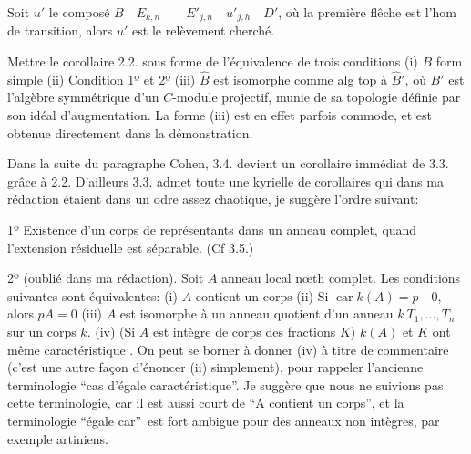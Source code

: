 Soit $u'$ le composé  $B\quad E_{k,n}\qquad E'_{j,n}\quad u'_{j,h}\quad D'$, où la première flêche est l'hom de transition, alors $u'$ est le relèvement cherché.

Mettre le corollaire 2.2. sous forme de l'équivalence de trois conditions (i) $B$ form simple (ii) Condition 1º et 2º (iii) $\hat B$ est isomorphe comme alg top à $\hat B'$, où $B'$ est l'algèbre symmétrique d'un $C$-module projectif, munie de  sa topologie définie par son idéal d'augmentation. La forme (iii) est en effet parfois commode, et est obtenue directement dans la démonstration.


Dans la suite du paragraphe Cohen, 3.4. devient un corollaire immédiat de 3.3. grâce à 2.2. D'ailleurs 3.3. admet toute une kyrielle de corollaires qui dans ma rédaction étaient dans un odre assez chaotique, je suggère  l'ordre suivant:

1º Existence d'un corps de représentants dans un anneau  complet, quand l'extension résiduelle est séparable. (Cf 3.5.)

2º (oublié dans ma rédaction). Soit $A$ anneau local nœth complet. Les conditions suivantes sont équivalentes: (i) $A$ contient un corps (ii) Si $\operatorname{car} k(A)=p\quad0$, alors $pA=0$ (iii) $A$ est isomorphe à un anneau quotient d'un anneau $k\ T_1,\ldots,T_n$ sur un corps $k$. (iv) (Si $A$ est intègre de corps des fractions $K$) $k(A)$ et $K$ ont même caractéristique . On peut se borner à donner (iv) à titre de commentaire (c'est une autre façon d'énoncer (ii) simplement), pour  rappeler l'ancienne terminologie \textquotedblleft cas d'égale caractéristique\textquotedblright. Je suggère que nous ne suivions pas cette terminologie, car il est aussi court de  \textquotedblleft A contient un corps\textquotedblright, et la terminologie \textquotedblleft égale car\textquotedblright\ est fort ambigue pour des anneaux non intègres, par exemple artiniens.


